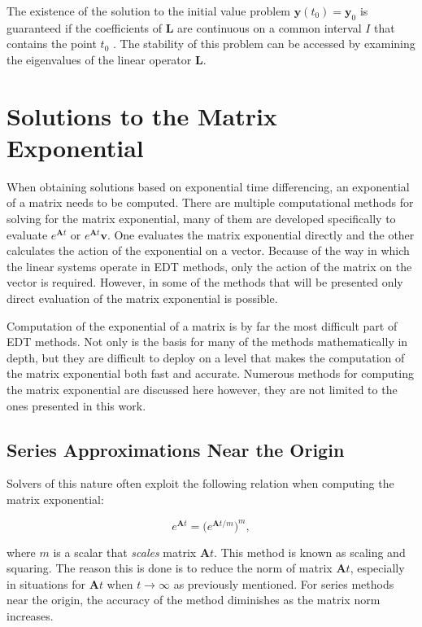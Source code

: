 The existence of the solution to the initial value problem $\boldsymbol{y}(t_{0}) = \boldsymbol{y}_{0}$ is guaranteed if the coefficients of $\boldsymbol{L}$ are continuous on a common interval $I$ that contains the point $t_{0}$ \cite{zill2012}. The stability of this problem can be accessed by examining the eigenvalues of the linear operator $\boldsymbol{L}$. 

\section{Solutions to the Matrix Exponential}
When obtaining solutions based on exponential time differencing, an exponential of a matrix needs to be computed. There are multiple computational methods for solving for the matrix exponential, many of them are developed specifically to evaluate $e^{\boldsymbol{A}t}$ or $e^{\boldsymbol{A}t}\boldsymbol{v}$. One evaluates the matrix exponential directly and the other calculates the action of the exponential on a vector. Because of the way in which the linear systems operate in EDT methods,  only the action of the matrix on the vector is required. However, in some of the methods that will be presented only direct evaluation of the matrix exponential is possible. 

Computation of the exponential of a matrix is by far the most difficult part of EDT methods. Not only is the basis for many of the methods mathematically in depth, but they are difficult to deploy on a level that makes the computation of the matrix exponential both fast and accurate. Numerous methods for computing the matrix exponential are discussed here however, they are not limited to the ones presented in this work. 

\subsection{Series Approximations Near the Origin} \label{subsec:seriesapprox}
Solvers of this nature often exploit the following relation when computing the matrix exponential:

\begin{equation}
    e^{\boldsymbol{A}t} = \big(e^{\boldsymbol{A}t/m}\big)^{m},
\end{equation}

\noindent where $m$ is a scalar that \textit{scales} matrix $\boldsymbol{A}t$. This method is known as scaling and squaring. The reason this is done is to reduce the norm of matrix $\boldsymbol{A}t$, especially in situations for $\boldsymbol{A}t$ when $t \rightarrow \infty$ as previously mentioned. For series methods near the origin, the accuracy of the method diminishes as the matrix norm increases. 


